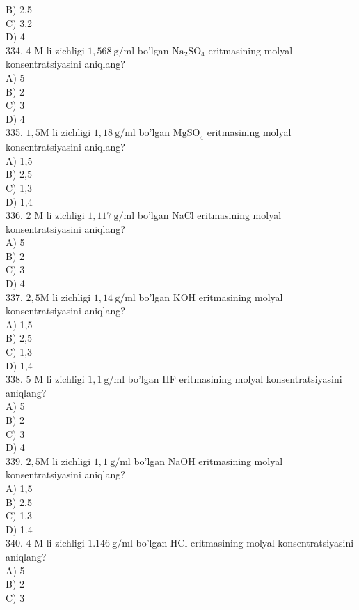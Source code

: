 B) 2,5\\
C) 3,2\\
D) 4\\
334. 4 M li zichligi $1,568 \mathrm{~g} / \mathrm{ml}$ bo'lgan $\mathrm{Na}_{2} \mathrm{SO}_{4}$ eritmasining molyal konsentratsiyasini aniqlang?\\
A) 5\\
B) 2\\
C) 3\\
D) 4\\
335. $1,5 \mathrm{M}$ li zichligi $1,18 \mathrm{~g} / \mathrm{ml}$ bo'lgan $\mathrm{MgSO}_{4}$ eritmasining molyal konsentratsiyasini aniqlang?\\
A) 1,5\\
B) 2,5\\
C) 1,3\\
D) 1,4\\
336. 2 M li zichligi $1,117 \mathrm{~g} / \mathrm{ml}$ bo'lgan NaCl eritmasining molyal konsentratsiyasini aniqlang?\\
A) 5\\
B) 2\\
C) 3\\
D) 4\\
337. $2,5 \mathrm{M}$ li zichligi $1,14 \mathrm{~g} / \mathrm{ml}$ bo'lgan KOH eritmasining molyal konsentratsiyasini aniqlang?\\
A) 1,5\\
B) 2,5\\
C) 1,3\\
D) 1,4\\
338. 5 M li zichligi $1,1 \mathrm{~g} / \mathrm{ml}$ bo'lgan HF eritmasining molyal konsentratsiyasini aniqlang?\\
A) 5\\
B) 2\\
C) 3\\
D) 4\\
339. $2,5 \mathrm{M}$ li zichligi $1,1 \mathrm{~g} / \mathrm{ml}$ bo'lgan NaOH eritmasining molyal konsentratsiyasini aniqlang?\\
A) 1,5\\
B) 2.5\\
C) 1.3\\
D) 1.4\\
340. 4 M li zichligi $1.146 \mathrm{~g} / \mathrm{ml}$ bo'lgan HCl eritmasining molyal konsentratsiyasini aniqlang?\\
A) 5\\
B) 2\\
C) 3\\
